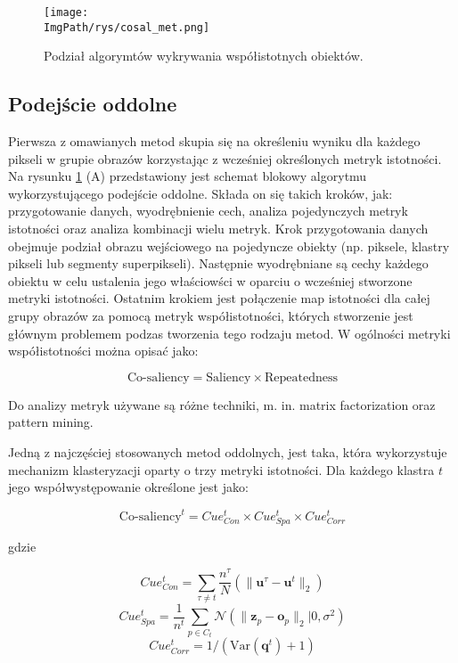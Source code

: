 \documentclass[a4paper,12pt,twoside,openany]{report}
\newcommand{\ImgPath}{.}
\begin{document}
	\begin{figure}[h]
		\centering
		\texttt{[image: \\ImgPath/rys/cosal\_met.png]}
		\caption{Podział algorymtów wykrywania współistotnych obiektów.}
		\label{pod}
	\end{figure}

	\subsection{Podejście oddolne}
	Pierwsza z omawianych metod skupia się na określeniu wyniku dla każdego pikseli w grupie obrazów korzystając z wcześniej określonych metryk istotności. Na rysunku \ref{pod} (A) przedstawiony jest schemat blokowy algorytmu wykorzystującego podejście oddolne. Składa on się takich kroków, jak: przygotowanie danych, wyodrębnienie cech, analiza pojedynczych metryk istotności oraz analiza kombinacji wielu metryk. Krok przygotowania danych obejmuje podział obrazu wejściowego na pojedyncze obiekty (np. piksele, klastry pikseli lub segmenty superpikseli). Następnie wyodrębniane są cechy każdego obiektu w celu ustalenia jego właściowści w oparciu o wcześniej stworzone metryki istotności. Ostatnim krokiem jest połączenie map istotności dla całej grupy obrazów za pomocą metryk współistotności, których stworzenie jest głównym problemem podzas tworzenia tego rodzaju metod. W ogólności metryki współistotności można opisać jako:

	$$
		\text{Co-saliency} = \text{Saliency} \times \text{Repeatedness}
	$$



	Do analizy metryk używane są różne techniki, m. in. matrix factorization oraz pattern mining. 

	Jedną z najczęściej stosowanych metod oddolnych, jest taka, która wykorzystuje mechanizm klasteryzacji oparty o trzy metryki istotności. Dla każdego klastra $t$ jego współwystępowanie określone jest jako:

	$$
		\text{Co-saliency}^t = Cue^t_{Con} \times Cue^t_{Spa} \times Cue^t_{Corr}
	$$

	gdzie

	$$
		Cue^t_{Con} = \sum_{\tau \neq t} \frac{n^\tau}{N}\left(\|\mathbf{u}^\tau - \mathbf{u}^t\|_2\right)
	$$
	$$
		Cue^t_{Spa} = \frac{1}{n^t}\sum_{p \in C_t} \mathcal{N}\left(\|\mathbf{z}_p - \mathbf{o}_p\|_2|0,\sigma^2\right)
	$$
	$$
		Cue^t_{Corr} = 1/\left(\text{Var}\left(\mathbf{q}^t\right)+1\right)
	$$
\end{document}

